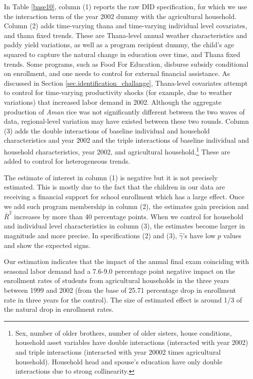 \documentclass[12pt,letterpaper]{article}\usepackage[margin=1in]{geometry}
\newcommand{\0}{\ensuremath{\mbox{\boldmath $0$}}}
\begin{document}
In Table \ref{base10}, column (1) reports the raw DID specification, for which we use the interaction term of the year 2002 dummy with the agricultural household. Column (2) adds time-varying thana and time-varying individual level covariates, and thana fixed trends. These are Thana-level annual weather characteristics and paddy yield variations, as well as a program recipient dummy, the child's age squared to capture the natural change in education over time, and Thana fixed trends. Some programs, such as Food For Education, disburse subsidy conditional on enrollment, and one needs to control for external financial assistance. As discussed in Section \ref{sec.identification_challange}, Thana-level covariates attempt to control for time-varying productivity shocks (for example, due to weather variations) that increased labor demand in 2002. Although the aggregate production of \textit{Aman} rice was not significantly different between the two waves of data, regional-level variation may have existed between these two rounds. Column (3) adds the double interactions of baseline individual and household characteristics and year 2002 and the triple interactions of baseline individual and household characteristics, year 2002, and agricultural household.\footnote{Sex, number of older brothers, number of older sisters, house conditions, household asset variables have double interactions (interacted with year 2002) and triple interactions (interacted with year 20002 times agricultural household). Household head and spouse's education have only double interactions due to strong collinearity. } These are added to control for heterogeneous trends. 

The estimate of interest in column (1) is negative but it is not precisely estimated. This is mostly due to the fact that the children in our data are receiving a financial support for school enrollment which has a large effect. Once we add such program membership in column (2), the estimates gain precision and $\bar{R}^{2}$ increases by more than 40 percentage points. When we control for household and individual level characteristics in column (3), the estimates become larger in magnitude and more precise. In specifications (2) and (3), $\hat{\gamma}$'s have low $p$ values and show the expected signs. 

Our estimation indicates that the impact of the annual final exam coinciding with seasonal labor demand had a 7.6-9.0 percentage point negative impact on the enrollment rates of students from agricultural households in the three years between 1999 and 2002 (from the base of 25.71 percentage drop in enrollment rate in three years for the control). The size of estimated effect is around 1/3 of the natural drop in enrollment rates. 
\end{document}
